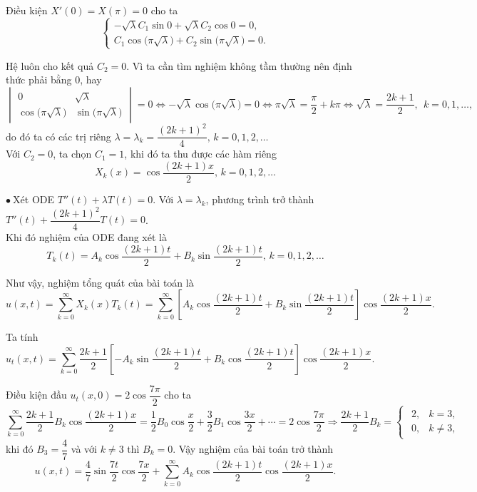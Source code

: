 \documentclass[10pt, a4paper]{article}
\begin{document}
	Điều kiện $X'(0)=X(\pi)=0$ cho ta $$\begin{cases}
		-\sqrt\lambda C_1\sin0+\sqrt\lambda C_2\cos0=0,\\
		C_1\cos\big(\pi\sqrt\lambda\big)+C_2\sin\big(\pi\sqrt\lambda\big)=0.
	\end{cases}$$
	
	Hệ luôn cho kết quả $C_2=0$. Vì ta cần tìm nghiệm không tầm thường nên định thức phải bằng 0, hay $$\begin{vmatrix}
		0&\sqrt\lambda\\
		\cos\big(\pi\sqrt\lambda\big)&\sin\big(\pi\sqrt\lambda\big)
	\end{vmatrix}=0\iff-\sqrt\lambda\cos\big(\pi\sqrt\lambda\big)=0\iff\pi\sqrt\lambda=\frac\pi2+k\pi\iff\sqrt\lambda=\frac{2k+1}{2},~~k=0,1,\ldots,$$
	do đó ta có các trị riêng $\lambda=\lambda_k=\dfrac{(2k+1)^2}{4},\,k=0,1,2,\ldots$\\
	
	Với $C_2=0$, ta chọn $C_1=1$, khi đó ta thu được các hàm riêng $$X_k(x)=\cos\frac{(2k+1)x}{2},\,k=0,1,2,\ldots$$
	
	$\bullet~$Xét ODE $T''(t)+\lambda T(t)=0$. Với $\lambda=\lambda_k$, phương trình trở thành $T''(t)+\dfrac{(2k+1)^2}{4}T(t)=0$.\\
	
	Khi đó nghiệm của ODE đang xét là $$T_k(t)=A_k\cos\frac{(2k+1)t}{2}+B_k\sin\frac{(2k+1)t}{2},\,k=0,1,2,\ldots$$
	
	Như vậy, nghiệm tổng quát của bài toán là $$u(x,t)=\sum_{k=0}^\infty X_k(x)T_k(t)=\sum_{k=0}^\infty\left[A_k\cos\frac{(2k+1)t}{2}+B_k\sin\frac{(2k+1)t}{2}\right]\cos\frac{(2k+1)x}{2}.$$
	
	Ta tính $$u_t(x,t)=\sum_{k=0}^\infty\frac{2k+1}{2}\left[-A_k\sin\frac{(2k+1)t}{2}+B_k\cos\frac{(2k+1)t}{2}\right]\cos\frac{(2k+1)x}{2}.$$
	
	Điều kiện đầu $u_t(x,0)=2\cos\dfrac{7\pi}{2}$ cho ta $$\sum_{k=0}^\infty\frac{2k+1}{2}B_k\cos\frac{(2k+1)x}{2}=\frac12B_0\cos\frac x2+\frac32B_1\cos\frac{3x}{2}+\cdots=2\cos\dfrac{7\pi}{2}\Rightarrow\frac{2k+1}{2}B_k=\begin{cases}
		\begin{array}{ll}
			2, & k=3, \\
			0, & k\ne3,
		\end{array}
	\end{cases}$$
	khi đó $B_3=\dfrac47$ và với $k\ne3$ thì $B_k=0$. Vậy nghiệm của bài toán trở thành $$u(x,t)=\frac47\sin\frac{7t}{2}\cos\frac{7x}{2}+\sum_{k=0}^\infty A_k\cos\frac{(2k+1)t}{2}\cos\frac{(2k+1)x}{2}.$$
	
\end{document}
